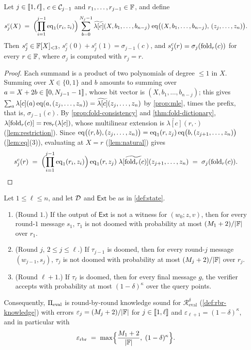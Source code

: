 \begin{lemma}\label{lem:rbr-sumcheck}
Let $j \in \llbracket 1, \ell \rrbracket$, $c \in \mathcal{C}_{j-1}$ and $r_1,\dots,r_{j-1} \in \mathbb{F}$, and define
\[
  s^{c}_j(X) \;=\; \Bigl(\prod_{i=1}^{j-1}\mathrm{eq}_1(r_i,z_i)\Bigr) \sum_{b=0}^{N_{j}-1} \widetilde{\lambda[c]}(X, b_1,\dots,b_{n-j})\;\mathrm{eq}\bigl((X,b_1,\dots,b_{n-j}),\, (z_j,\dots,z_{n})\bigr).
\]
Then $s^{c}_j \in \mathbb{F}[X]_{<3}$, $s^{c}_j(0) + s^{c}_j(1) = \sigma_{j-1}(c)$, and $s^{c}_j(r) = \sigma_{j}(\mathrm{fold}_r(c))$ for every $r \in \mathbb{F}$, where $\sigma_j$ is computed with $r_j = r$.
\end{lemma}

\begin{proof}
Each summand is a product of two polynomials of degree $\le 1$ in $X$.
Summing over $X \in \{0,1\}$ and $b$ amounts to summing over $a = X + 2b \in \llbracket 0, N_{j-1}-1 \rrbracket$, whose bit vector is $(X, b_1,\dots,b_{n-j})$; this gives $\sum_{a} \lambda[c](a)\, \mathrm{eq}(a, (z_j,\dots,z_n)) = \widetilde{\lambda[c]}(z_j,\dots,z_n)$ by \cref{prop:mle}, times the prefix, that is, $\sigma_{j-1}(c)$.
By \cref{prop:fold-consistency} and \cref{thm:fold-dictionary}, $\lambda[\mathrm{fold}_r(c)] = \mathrm{res}_r(\lambda[c])$, whose multilinear extension is $\widetilde{\lambda[c]}(r,\cdot)$ (\cref{lem:restriction}).
Since $\mathrm{eq}\bigl((r,b), (z_j,\dots,z_n)\bigr) = \mathrm{eq}_1(r,z_j)\,\mathrm{eq}\bigl(b,(z_{j+1},\dots,z_n)\bigr)$ (\cref{lem:eq}(3)), evaluating at $X = r$ (\cref{lem:natural}) gives
\[
  s^c_j(r) \;=\; \Bigl(\prod_{i=1}^{j-1}\mathrm{eq}_1(r_i,z_i)\Bigr)\,\mathrm{eq}_1(r,z_j)\;\widetilde{\lambda[\mathrm{fold}_r(c)]}(z_{j+1},\dots,z_n) \;=\; \sigma_j(\mathrm{fold}_r(c)). \qedhere
\]
\end{proof}

\begin{theorem}\label{thm:rbr}
Let $1 \le \ell \le n$, and let $\mathcal{D}$ and $\mathsf{Ext}$ be as in \cref{def:state}.
\begin{enumerate}
  \item (Round $1$.) If the output of $\mathsf{Ext}$ is not a witness for $(w_0; z,v)$, then for every round-$1$ message $s_1$, $\tau_1$ is not doomed with probability at most $(M_1 + 2)/|\mathbb{F}|$ over $r_1$.
  \item (Round $j$, $2 \le j \le \ell$.) If $\tau_{j-1}$ is doomed, then for every round-$j$ message $(w_{j-1}, s_j)$, $\tau_j$ is not doomed with probability at most $(M_j+2)/|\mathbb{F}|$ over $r_j$.
  \item (Round $\ell+1$.) If $\tau_\ell$ is doomed, then for every final message $g$, the verifier accepts with probability at most $(1-\delta)^{\kappa}$ over the query points.
\end{enumerate}
Consequently, $\Pi_{\mathrm{eval}}$ is round-by-round knowledge sound for $\mathcal{R}^{\delta}_{\mathrm{eval}}$ (\cref{def:rbr-knowledge}) with errors $\varepsilon_j = (M_j+2)/|\mathbb{F}|$ for $j \in \llbracket 1, \ell \rrbracket$ and $\varepsilon_{\ell+1} = (1-\delta)^\kappa$, and in particular with
\[
  \varepsilon_{\mathrm{rbr}} \;=\; \max\Bigl\{ \frac{M_1 + 2}{|\mathbb{F}|},\; (1-\delta)^{\kappa} \Bigr\}.
\]
\end{theorem}

